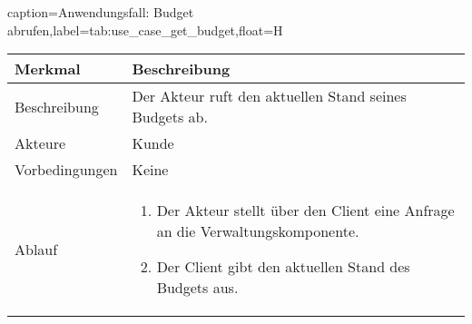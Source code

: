\begin{dhbwtable}{caption={Anwendungsfall: Budget abrufen},label=tab:use_case_get_budget,float=H}
    \begin{tabularx}{\textwidth}{lX}
        \toprule
        \textbf{Merkmal} & \textbf{Beschreibung}  \\ \midrule
        Beschreibung    &  Der Akteur ruft den aktuellen Stand seines Budgets ab. \\
        Akteure         &  Kunde \\
        Vorbedingungen  &  Keine \\
        Ablauf          & \begin{minipage}[t]{\linewidth}
        \vspace*{-3mm}
        \begin{enumerate}[leftmargin=*,nosep,after=\strut]
            \item Der Akteur stellt über den Client eine Anfrage an die Verwaltungskomponente.
            \item Der Client gibt den aktuellen Stand des Budgets aus.
        \end{enumerate}
        \end{minipage} \\\bottomrule
    \end{tabularx}    
\end{dhbwtable}

